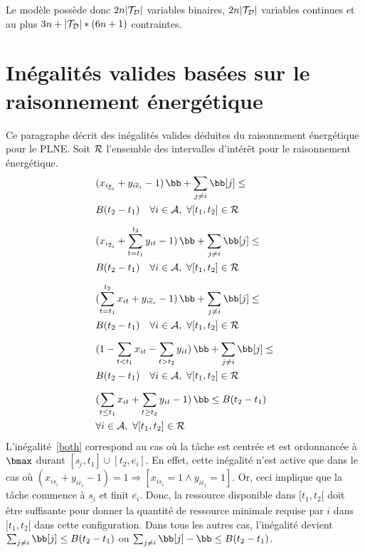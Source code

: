 Le modèle possède donc $2n|{\cal T}_{\cal D}|$ variables binaires,
$2n|{\cal T}_{\cal D}|$ variables continues et au plus $3n+|{\cal
T}_{\cal D}|*(6n+1)$ contraintes.

\section{Inégalités valides basées sur le raisonnement énergétique}
Ce paragraphe décrit des inégalités valides déduites du raisonnement
énergétique pour le PLNE. Soit ${\cal R}$ l'ensemble des intervalles
d'intérêt pour le raisonnement énergétique.
{\scriptsize
\begin{align}
&(x_{i\underline{s}_i} + y_{i\overline{e}_i} -1 ) \, \bb + \sum_{j\neq i}
  \bb[j] \le \nonumber\\ 
&  B(t_2-t_1) \quad \forall i \in {\cal A},\ \forall
  [t_1,t_2] \in {\cal R}
\label{both}\\[2mm] 
&(x_{i\underline{s}_i} + \sum_{t=t_1}^{t_2}y_{it} -1) \, \bb + \sum_{j\neq i}
  \bb[j] \le \nonumber \\
&  B(t_2-t_1) \quad \forall i \in {\cal A},\ \forall
  [t_1,t_2] \in {\cal R}
\label{left}\\[2mm] 
&(\sum_{t=t_1}^{t_2}x_{it} + y_{i\overline{e}_i}-1) \, \bb + \sum_{j\neq i}
  \bb[j] \le \nonumber\\
&  B(t_2-t_1) \quad \forall i \in {\cal A},\ \forall
  [t_1,t_2] \in {\cal R}
\label{right}\\[2mm] 
&(1-\sum_{t<t_1}x_{it} - \sum_{t>t_2}y_{it}) \, \bb + \sum_{j\neq i}
  \bb[j] \le \nonumber \\
&  B(t_2-t_1) \quad \forall i \in {\cal A},\ \forall
  [t_1,t_2] \in {\cal R}
\label{total}\\[2mm] 
&(\sum_{t\le t_1}x_{it} + \sum_{t\ge t_2}y_{it} -1 ) \, \bb  \le
B(t_2-t_1) \nonumber\\
&\forall i \in {\cal A},\ \forall
[t_1,t_2] \in {\cal R}
\label{min}
\end{align}
}
L'inégalité~\eqref{both} correspond au cas où la tâche est centrée et est
ordonnancée à $\bmax$ durant $[\underline{s_i},t_1] \cup
[t_2,\overline{e_i}]$. En effet, cette inégalité n'est active que dans
le cas où $(x_{i\underline{s}_i} + y_{i\overline{e}_i} -1 )= 1 \Rightarrow
\left[x_{i\underline{s}_i}=1\land y_{i\overline{e}_i}=1\right]$. Or,
ceci implique que la tâche commence à $\underline{s_i}$ et finit
$\overline{e_i}$. Donc, la ressource disponible dans $[t_1,t_2[$ doit
être suffisante pour donner la quantité de ressource minimale requise
par $i$ dans $[t_1,t_2[$ dans cette configuration.  Dans tous les
autres cas, l'inégalité devient $\sum_{j\neq i} \bb[j] \le B(t_2-t_1)$
ou $\sum_{j\neq i} \bb[j] - \bb \le B(t_2-t_1)$.

